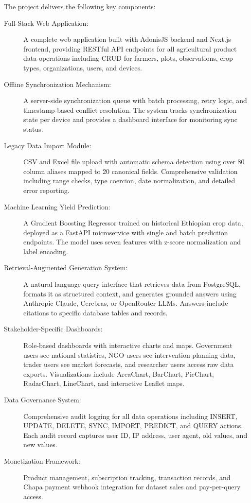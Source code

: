 The project delivers the following key components:

\begin{description}
  \item[Full-Stack Web Application:] A complete web application built with AdonisJS backend and Next.js frontend, providing RESTful API endpoints for all agricultural product data operations including CRUD for farmers, plots, observations, crop types, organizations, users, and devices.
  
  \item[Offline Synchronization Mechanism:] A server-side synchronization queue with batch processing, retry logic, and timestamp-based conflict resolution. The system tracks synchronization state per device and provides a dashboard interface for monitoring sync status.
  
  \item[Legacy Data Import Module:] CSV and Excel file upload with automatic schema detection using over 80 column aliases mapped to 20 canonical fields. Comprehensive validation including range checks, type coercion, date normalization, and detailed error reporting.
  
  \item[Machine Learning Yield Prediction:] A Gradient Boosting Regressor trained on historical Ethiopian crop data, deployed as a FastAPI microservice with single and batch prediction endpoints. The model uses seven features with z-score normalization and label encoding.
  
  \item[Retrieval-Augmented Generation System:] A natural language query interface that retrieves data from PostgreSQL, formats it as structured context, and generates grounded answers using Anthropic Claude, Cerebras, or OpenRouter LLMs. Answers include citations to specific database tables and records.
  
  \item[Stakeholder-Specific Dashboards:] Role-based dashboards with interactive charts and maps. Government users see national statistics, NGO users see intervention planning data, trader users see market forecasts, and researcher users access raw data exports. Visualizations include AreaChart, BarChart, PieChart, RadarChart, LineChart, and interactive Leaflet maps.
  
  \item[Data Governance System:] Comprehensive audit logging for all data operations including INSERT, UPDATE, DELETE, SYNC, IMPORT, PREDICT, and QUERY actions. Each audit record captures user ID, IP address, user agent, old values, and new values.
  
  \item[Monetization Framework:] Product management, subscription tracking, transaction records, and Chapa payment webhook integration for dataset sales and pay-per-query access.
\end{description}

